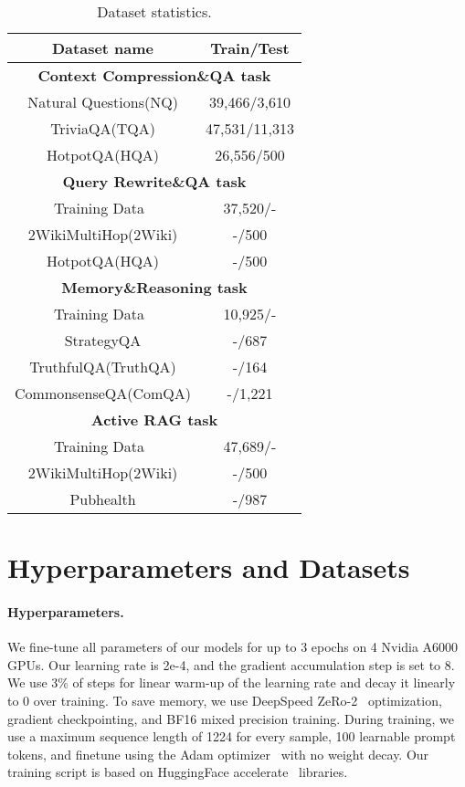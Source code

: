 \begin{table}[t]
    \centering
    \begin{tabular}{cc}
        \toprule
        \textbf{Dataset name} & \textbf{Train/Test} \\
        \midrule
        \multicolumn{2}{c}{\textbf{Context Compression\&QA task}} \\
        Natural Questions(NQ) & 39,466/3,610 \\
        TriviaQA(TQA) & 47,531/11,313 \\
        HotpotQA(HQA) & 26,556/500 \\
        \midrule
        \multicolumn{2}{c}{\textbf{Query Rewrite\&QA task}} \\
        Training Data~\cite{ma2023query} & 37,520/-\\ 
        2WikiMultiHop(2Wiki) & -/500 \\
        HotpotQA(HQA) & -/500 \\
        \midrule
        \multicolumn{2}{c}{\textbf{Memory\&Reasoning task}} \\
        Training Data~\cite{jin2024disentangling} & 10,925/- \\
        StrategyQA & -/687 \\
        TruthfulQA(TruthQA) & -/164 \\
        CommonsenseQA(ComQA) & -/1,221 \\
        \midrule
        \multicolumn{2}{c}{\textbf{Active RAG task}} \\
       Training Data~\cite{lyu2024retrieve} & 47,689/- \\
        2WikiMultiHop(2Wiki) & -/500 \\
        Pubhealth & -/987 \\
        \bottomrule
    \end{tabular}
    \caption{Dataset statistics.}
    \label{tab:datasets}
\end{table} 


\section{Hyperparameters and Datasets}
\label{sec:hyper}

\paragraph{Hyperparameters.} We fine-tune all parameters of our models for up to 3 epochs on 4 Nvidia A6000 GPUs. Our learning rate is 2e-4, and the gradient accumulation step is set to 8. We use
3\% of steps for linear warm-up of the learning rate and decay it linearly to 0 over training. To save
memory, we use DeepSpeed ZeRo-2~\cite{rajbhandari2020zero,rasley2020deepspeed} optimization, gradient checkpointing, and BF16 mixed precision training. During training, we use a maximum sequence length of 1224 for every sample, 100 learnable prompt tokens, and finetune using the Adam optimizer~\cite{kingma2014adam} with no weight decay. Our training script is based on HuggingFace accelerate~\cite{accelerate} libraries.


